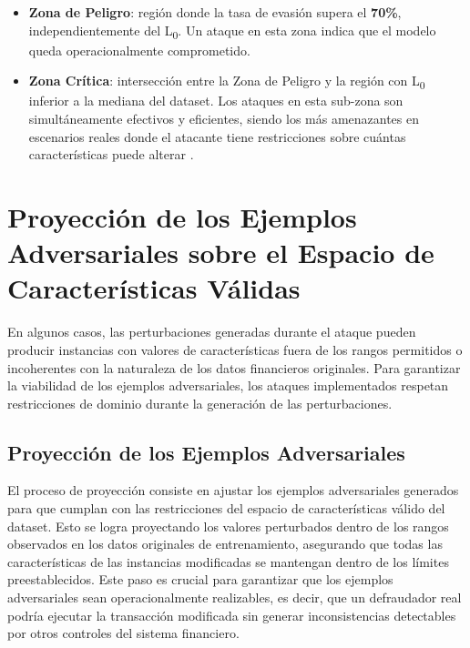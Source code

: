 \begin{itemize}
    \item \textbf{Zona de Peligro}: región donde la tasa de evasión supera el \textbf{70\%}, independientemente del L\textsubscript{0}. Un ataque en esta zona indica que el modelo queda operacionalmente comprometido.
    \item \textbf{Zona Crítica}: intersección entre la Zona de Peligro y la región con L\textsubscript{0} inferior a la mediana del dataset. Los ataques en esta sub-zona son simultáneamente efectivos y eficientes, siendo los más amenazantes en escenarios reales donde el atacante tiene restricciones sobre cuántas características puede alterar \cite{cartella2023adversarial}.
\end{itemize}

\section{Proyección de los Ejemplos Adversariales sobre el Espacio de Características Válidas}

En algunos casos, las perturbaciones generadas durante el ataque pueden producir instancias con valores de características fuera de los rangos permitidos o incoherentes con la naturaleza de los datos financieros originales. Para garantizar la viabilidad de los ejemplos adversariales, los ataques implementados respetan restricciones de dominio durante la generación de las perturbaciones.

\subsection{Proyección de los Ejemplos Adversariales}

El proceso de proyección consiste en ajustar los ejemplos adversariales generados para que cumplan con las restricciones del espacio de características válido del dataset. Esto se logra proyectando los valores perturbados dentro de los rangos observados en los datos originales de entrenamiento, asegurando que todas las características de las instancias modificadas se mantengan dentro de los límites preestablecidos. Este paso es crucial para garantizar que los ejemplos adversariales sean operacionalmente realizables, es decir, que un defraudador real podría ejecutar la transacción modificada sin generar inconsistencias detectables por otros controles del sistema financiero.

